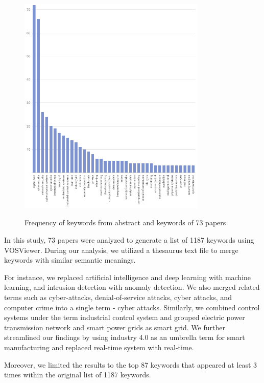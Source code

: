 \begin{figure}[H]
    \caption{Frequency of keywords from abstract and keywords of 73 papers}
    \includegraphics[width=0.8\textwidth]{images/keyword_occurance.png}
    \label{fig:alluvial-key}
\end{figure}
In this study, 73 papers were analyzed to generate a list of 1187 keywords using VOSViewer. During our analysis, we utilized a thesaurus text file to merge keywords with similar semantic meanings.

For instance, we replaced artificial intelligence and deep learning with machine learning, and intrusion detection with anomaly detection. We also merged related terms such as cyber-attacks, denial-of-service attacks, cyber attacks, and computer crime into a single term - cyber attacks. Similarly, we combined control systems under the term industrial control system and grouped electric power transmission network and smart power grids as smart grid. We further streamlined our findings by using industry 4.0 as an umbrella term for smart manufacturing and replaced real-time system with real-time.

Moreover, we limited the results to the top 87 keywords that appeared at least 3 times within the original list of 1187 keywords.  


